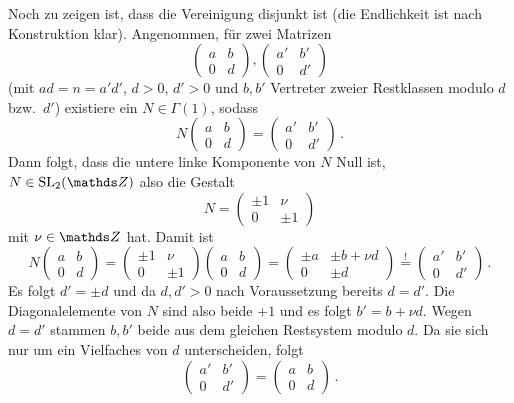 \begin{bewe}
Noch zu zeigen ist, dass die Vereinigung disjunkt ist (die Endlichkeit ist nach Konstruktion klar). Angenommen, für zwei Matrizen
\[
\begin{pmatrix}
a & b\\
0 & d
\end{pmatrix},
\begin{pmatrix}
a' & b'\\
0 & d'
\end{pmatrix}
\]
(mit $ad = n = a'd'$, $d > 0$, $d' > 0$ und $b, b'$ Vertreter zweier Restklassen modulo $d$ bzw.\ $d'$) existiere ein $N \in \Gamma (1)$, sodass
\[
N 
\begin{pmatrix}
a & b\\
0 & d
\end{pmatrix}
= 
\begin{pmatrix}
a' & b'\\
0 & d'
\end{pmatrix}
\,.
\]
Dann folgt, dass die untere linke Komponente von $N$ Null ist, $N \in \SL_2(\ZZ)$ also die Gestalt
\[
N = 
\begin{pmatrix}
\pm 1 & \nu\\
0 & \pm 1
\end{pmatrix}
\]
mit $\nu \in \ZZ$ hat. Damit ist 
\[
N
\begin{pmatrix}
a & b\\
0 & d
\end{pmatrix}
=
\begin{pmatrix}
\pm 1 & \nu\\
0 & \pm 1
\end{pmatrix}
\begin{pmatrix}
a & b\\
0 & d
\end{pmatrix}
= 
\begin{pmatrix}
\pm a & \pm b + \nu d\\ 
0 & \pm d
\end{pmatrix}
\overset !=
\begin{pmatrix}
a' & b'\\ 
0 & d'
\end{pmatrix}
\,.
\]
Es folgt $d' = \pm d$ und da $d, d' > 0$ nach Voraussetzung bereits $d = d'$. Die Diagonalelemente von $N$ sind also beide $+1$ und es folgt $b' = b + \nu d$. Wegen $d = d'$ stammen $b, b'$ beide aus dem gleichen Restsystem modulo $d$. Da sie sich nur um ein Vielfaches von $d$ unterscheiden, folgt
\[
\begin{pmatrix}
a' & b' \\ 0 & d'
\end{pmatrix} = \begin{pmatrix}
a & b \\ 0 & d
\end{pmatrix}
\,.
\]
\end{bewe}

